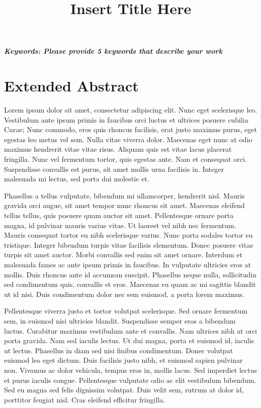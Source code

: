 \documentclass[a4paper,12pt]{article}
\title{Insert Title Here}
\author[]{} %
\date{}
\begin{document}
\maketitle
\thispagestyle{fancy}

\vspace{-6em}
\begin{center}
\textbf{\textit{Keywords: Please provide 5 keywords that describe your work}}
\newline
\end{center}

\section*{Extended Abstract}
Lorem ipsum dolor sit amet, consectetur adipiscing elit. Nunc eget scelerisque leo. Vestibulum ante ipsum primis in faucibus orci luctus et ultrices posuere cubilia Curae; Nunc commodo, eros quis rhoncus facilisis, erat justo maximus purus, eget egestas leo metus vel sem. Nulla vitae viverra dolor. Maecenas eget nunc at odio maximus hendrerit vitae vitae risus. Aliquam quis est vitae lacus placerat fringilla. Nunc vel fermentum tortor, quis egestas ante. Nam et consequat orci. Suspendisse convallis est purus, sit amet mollis urna facilisis in. Integer malesuada mi lectus, sed porta dui molestie et. 

Phasellus a tellus vulputate, bibendum mi ullamcorper, hendrerit nisl. Mauris gravida orci augue, sit amet tempor nunc rhoncus sit amet. Maecenas eleifend tellus tellus, quis posuere quam auctor sit amet. Pellentesque ornare porta magna, id pulvinar mauris varius vitae. Ut laoreet vel nibh nec fermentum. Mauris consequat tortor eu nibh scelerisque varius. Nunc porta sodales tortor eu tristique. Integer bibendum turpis vitae facilisis elementum. Donec posuere vitae turpis sit amet auctor. Morbi convallis sed enim sit amet ornare. Interdum et malesuada fames ac ante ipsum primis in faucibus. In vulputate ultricies eros at mollis. Duis rhoncus ante id accumsan suscipit. Phasellus neque nulla, sollicitudin sed condimentum quis, convallis et eros. Maecenas eu quam ac mi sagittis blandit ut id nisi. Duis condimentum dolor nec sem euismod, a porta lorem maximus. 

Pellentesque viverra justo et tortor volutpat scelerisque. Sed ornare fermentum sem, in euismod nisi ultricies blandit. Suspendisse semper eros a bibendum luctus. Curabitur maximus vestibulum ante et convallis. Nam ultrices nibh at orci porta gravida. Nam sed iaculis lectus. Ut dui magna, porta et euismod id, iaculis ut lectus. Phasellus in diam sed nisi finibus condimentum. Donec volutpat euismod leo eget dictum. Duis facilisis justo nibh, et euismod sapien pulvinar non. Vivamus ac dolor vehicula, tempus eros in, mollis lacus. Sed imperdiet lectus et purus iaculis congue. Pellentesque vulputate odio ac elit vestibulum bibendum. Sed eu magna sed felis dignissim volutpat. Duis velit sem, rutrum at dolor id, porttitor feugiat nisl. Cras eleifend efficitur fringilla. 
\end{document}
